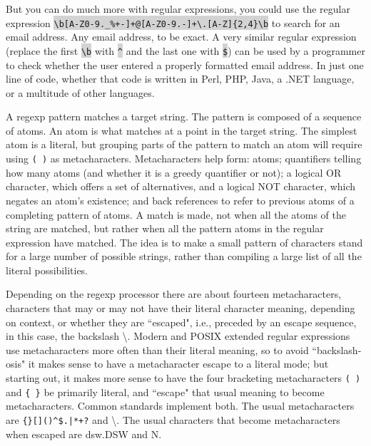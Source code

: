 But you can do much more with regular expressions, you could use the regular expression \colorbox{lightgray}{\texttt{\textbackslash b[A-Z0-9.\_\%+-]+@[A-Z0-9.-]+\textbackslash .[A-Z]\{2,4\}\textbackslash b}} to search for an email address. Any email address, to be exact. A very similar regular expression (replace the first \colorbox{lightgray}{\texttt{\textbackslash b}} with \colorbox{lightgray}{\texttt{\^{}}} and the last one with \colorbox{lightgray}{\texttt{\$}}) can be used by a programmer to check whether the user entered a properly formatted email address. In just one line of code, whether that code is written in Perl, PHP, Java, a .NET language, or a multitude of other languages.

A regexp pattern matches a target string. The pattern is composed of a sequence of atoms. An atom is what matches at a point in the target string. The simplest atom is a literal, but grouping parts of the pattern to match an atom will require using \texttt{( )} as metacharacters. Metacharacters help form: atoms; quantifiers telling how many atoms (and whether it is a greedy quantifier or not); a logical OR character, which offers a set of alternatives, and a logical NOT character, which negates an atom's existence; and back references to refer to previous atoms of a completing pattern of atoms. A match is made, not when all the atoms of the string are matched, but rather when all the pattern atoms in the regular expression have matched. The idea is to make a small pattern of characters stand for a large number of possible strings, rather than compiling a large list of all the literal possibilities.

Depending on the regexp processor there are about fourteen metacharacters, characters that may or may not have their literal character meaning, depending on context, or whether they are ``escaped", i.e., preceded by an escape sequence, in this case, the backslash \textbackslash. Modern and POSIX extended regular expressions use metacharacters more often than their literal meaning, so to avoid ``backslash-osis" it makes sense to have a metacharacter escape to a literal mode; but starting out, it makes more sense to have the four bracketing metacharacters \texttt{( )} and \texttt{\{ \}} be primarily literal, and ``escape" that usual meaning to become metacharacters. Common standards implement both. The usual metacharacters are \texttt{\{\}[]()\^{}\$.|*+?} and \textbackslash. The usual characters that become metacharacters when escaped are dsw.DSW and N.





